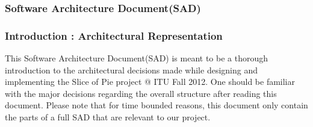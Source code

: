 \subsubsection{Software Architecture Document(SAD)}
\subsubsection{Introduction : Architectural Representation}
This Software Architecture Document(SAD) is meant to be a thorough introduction to the architectural decisions made while designing and implementing the Slice of Pie project @ ITU Fall 2012.
One should be familiar with the major decisions regarding the overall structure after reading this document. Please note that for time bounded reasons, this document only contain the parts of a full SAD that are relevant to our project. 
